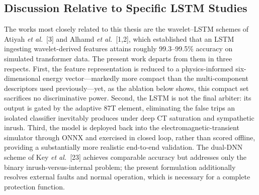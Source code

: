\documentclass[12pt,a4paper,oneside]{report}
\begin{document}
\subsection{Discussion Relative to Specific LSTM Studies}
The works most closely related to this thesis are the wavelet--LSTM schemes of Atiyah \textit{et al.}\ [3] and Alhamd \textit{et al.}\ [1,2], which established that an LSTM ingesting wavelet-derived features attains roughly 99.3--99.5\% accuracy on simulated transformer data. The present work departs from them in three respects. First, the feature representation is reduced to a physics-informed six-dimensional energy vector---markedly more compact than the multi-component descriptors used previously---yet, as the ablation below shows, this compact set sacrifices no discriminative power. Second, the LSTM is not the final arbiter: its output is gated by the adaptive 87T element, eliminating the false trips an isolated classifier inevitably produces under deep CT saturation and sympathetic inrush. Third, the model is deployed back into the electromagnetic-transient simulator through ONNX and exercised in closed loop, rather than scored offline, providing a substantially more realistic end-to-end validation. The dual-DNN scheme of Key \textit{et al.}\ [23] achieves comparable accuracy but addresses only the binary inrush-versus-internal problem; the present formulation additionally resolves external faults and normal operation, which is necessary for a complete protection function.
\end{document}
